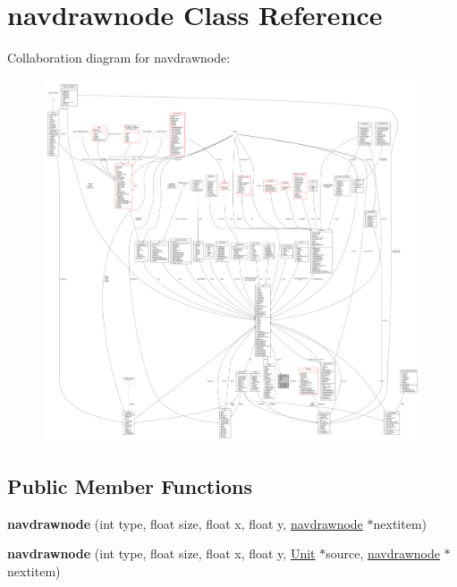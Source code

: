 \hypertarget{classnavdrawnode}{}\section{navdrawnode Class Reference}
\label{classnavdrawnode}


Collaboration diagram for navdrawnode\+:
\nopagebreak
\begin{figure}[H]
\begin{center}
\leavevmode
\includegraphics[width=350pt]{de/d03/classnavdrawnode__coll__graph}
\end{center}
\end{figure}
\subsection*{Public Member Functions}
\begin{DoxyCompactItemize}
\item 
{\bfseries navdrawnode} (int type, float size, float x, float y, \hyperlink{classnavdrawnode}{navdrawnode} $\ast$nextitem)\hypertarget{classnavdrawnode_a22f4701cae910092ca821bed17d94649}{}\label{classnavdrawnode_a22f4701cae910092ca821bed17d94649}

\item 
{\bfseries navdrawnode} (int type, float size, float x, float y, \hyperlink{classUnit}{Unit} $\ast$source, \hyperlink{classnavdrawnode}{navdrawnode} $\ast$nextitem)\hypertarget{classnavdrawnode_aefaaaa95ee37a9471e606e75d2801f9e}{}\label{classnavdrawnode_aefaaaa95ee37a9471e606e75d2801f9e}

\end{DoxyCompactItemize}
